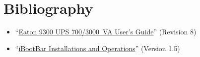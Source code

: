 \section{Bibliography}

\begin{flushleft}
\begin{itemize}
\item “\href{bibliography/eaton-9130-ups.pdf}{Eaton 9300 UPS 700/3000~VA User's Guide}” (Revision 8)
\item “\href{bibliography/dataprobe-ibootbar.pdf}{iBootBar Installations and Operations}” (Version 1.5)
\end{itemize}
\end{flushleft}

